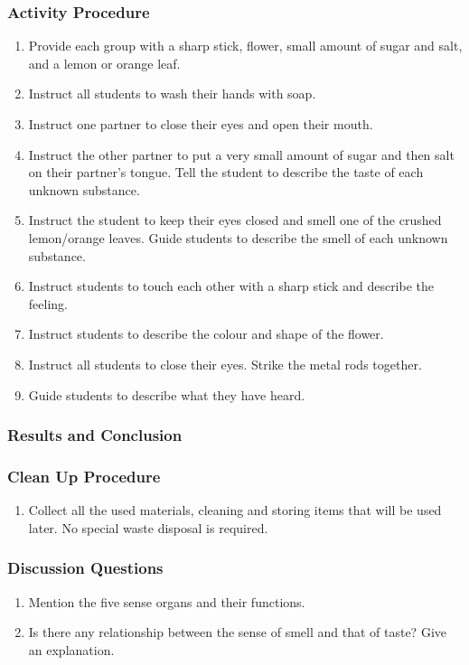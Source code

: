 \subsubsection*{Activity Procedure}
\begin{enumerate}
\item{Provide each group with a sharp stick, flower, small amount of sugar and salt, and a lemon or orange leaf.}
\item{Instruct all students to wash their hands with soap.}
\item{Instruct one partner to close their eyes and open their mouth.}
\item{Instruct the other partner to put a very small amount of sugar and then salt on their partner's tongue. Tell the student to describe the taste of each unknown substance.}
\item{Instruct the student to keep their eyes closed and smell one of the crushed lemon/orange leaves. Guide students to describe the smell of each unknown substance.}
\item{Instruct students to touch each other with a sharp stick and describe the feeling.}
\item{Instruct students to describe the colour and shape of the flower.}
\item{Instruct all students to close their eyes. Strike the metal rods together.}
\item{Guide students to describe what they have heard.}
\end{enumerate}

\subsubsection*{Results and Conclusion}


\subsubsection*{Clean Up Procedure}
\begin{enumerate}
\item{Collect all the used materials, cleaning and storing items that will be used later. No special waste disposal is required.}
\end{enumerate}

\subsubsection*{Discussion Questions}
\begin{enumerate}
\item{Mention the five sense organs and their functions.}
\item{Is there any relationship between the sense of smell and that of taste? Give an explanation.}
\end{enumerate}